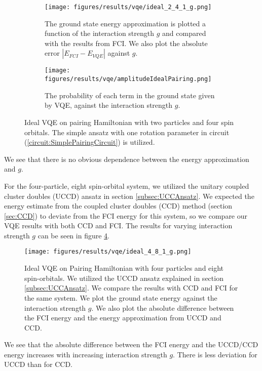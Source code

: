 \begin{figure}[H]
\begin{subfigure}{.5\textwidth}
  \centering
  \texttt{[image: figures/results/vqe/ideal\_2\_4\_1\_g.png]}  
  \caption{The ground state energy approximation is plotted a function of the interaction strength $g$ and compared with the results from FCI.  We also plot the absolute error $|E_{FCI} - E_{VQE}|$ against $g$.}
  \label{fig:IdealPairing2fermi4spin1deltag}
\end{subfigure}
\begin{subfigure}{.5\textwidth}
  \centering
  \texttt{[image: figures/results/vqe/amplitudeIdealPairing.png]}  
  \caption{The probability of each term in the ground state given by VQE, against the interaction strength $g$.}
  \label{fig:amplitudeagainstgidealpairingvqe}
\end{subfigure}
\caption{Ideal VQE on pairing Hamiltonian with two particles and four spin orbitals. The simple ansatz with one rotation parameter in circuit (\ref{circuit:SimplePairingCircuit}) is utilized.}
\label{fig:idealVQE}
\end{figure}
We see that there is no obvious dependence between the energy approximation and $g$. 

\bigskip 

For the four-particle, eight spin-orbital system, we utilized the unitary coupled cluster doubles (UCCD) ansatz in section \ref{subsec:UCCAnsatz}. We expected the energy estimate from the coupled cluster doubles (CCD) method (section \ref{sec:CCD}) to deviate from the FCI energy for this system, so we compare our VQE results with both CCD and FCI. The results for varying interaction strength $g$ can be seen in figure \ref{fig:IdealPairing4fermi8orbs}.
\begin{figure}[H]
    \centering
    \texttt{[image: figures/results/vqe/ideal\_4\_8\_1\_g.png]}
    \caption{Ideal VQE on Pairing Hamiltonian with four particles and eight spin-orbitals. We utilized the UCCD ansatz explained in section \ref{subsec:UCCAnsatz}. We compare the results with CCD and FCI for the same system. We plot the ground state energy against the interaction strength $g$. We also plot the absolute difference between the FCI energy and the energy approximation from UCCD and CCD.}
    \label{fig:IdealPairing4fermi8orbs}
\end{figure}
We see that the absolute difference between the FCI energy and the UCCD/CCD energy increases with increasing interaction strength $g$. There is less deviation for UCCD than for CCD.


